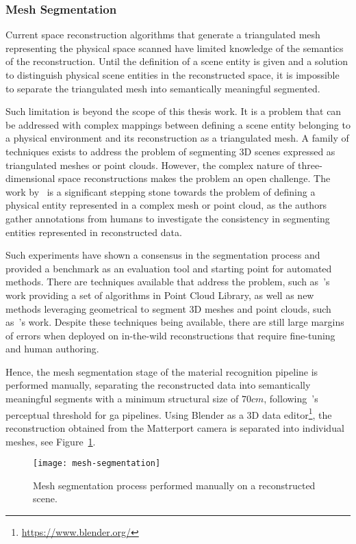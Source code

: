 \subsubsection{Mesh Segmentation}
Current space reconstruction algorithms that generate a triangulated mesh representing the physical space scanned have limited knowledge of the semantics of the reconstruction. Until the definition of a scene entity is given and a solution to distinguish physical scene entities in the reconstructed space, it is impossible to separate the triangulated mesh into semantically meaningful segmented.\par
Such limitation is beyond the scope of this thesis work. It is a problem that can be addressed with complex mappings between defining a scene entity belonging to a physical environment and its reconstruction as a triangulated mesh. A family of techniques exists to address the problem of segmenting 3D scenes expressed as triangulated meshes or point clouds. However, the complex nature of three-dimensional space reconstructions makes the problem an open challenge. The work by~\cite{chen2009benchmark} is a significant stepping stone towards the problem of defining a physical entity represented in a complex mesh or point cloud, as the authors gather annotations from humans to investigate the consistency in segmenting entities represented in reconstructed data.\par
Such experiments have shown a consensus in the segmentation process and provided a benchmark as an evaluation tool and starting point for automated methods. There are techniques available that address the problem, such as~\cite{rusu2011pcl}'s work providing a set of algorithms in Point Cloud Library, as well as new methods leveraging geometrical  to segment 3D meshes and point clouds, such as~\cite{feng2020semantic3d}'s work. Despite these techniques being available, there are still large margins of errors when deployed on in-the-wild reconstructions that require fine-tuning and human authoring.\par
Hence, the mesh segmentation stage of the material recognition pipeline is performed manually, separating the reconstructed data into semantically meaningful segments with a minimum structural size of $70cm$, following~\cite{pelzer2010frequency}'s perceptual threshold for \acrshort{ga} pipelines. Using Blender as a 3D data editor\footnote{\url{https://www.blender.org/}}, the reconstruction obtained from the Matterport camera is separated into individual meshes, see Figure~\ref{fig:mesh-segmentation}.\par
\begin{figure}
    \centering
    \texttt{[image: mesh-segmentation]}
    \caption{Mesh segmentation process performed manually on a reconstructed scene.}
    \label{fig:mesh-segmentation}
\end{figure}

